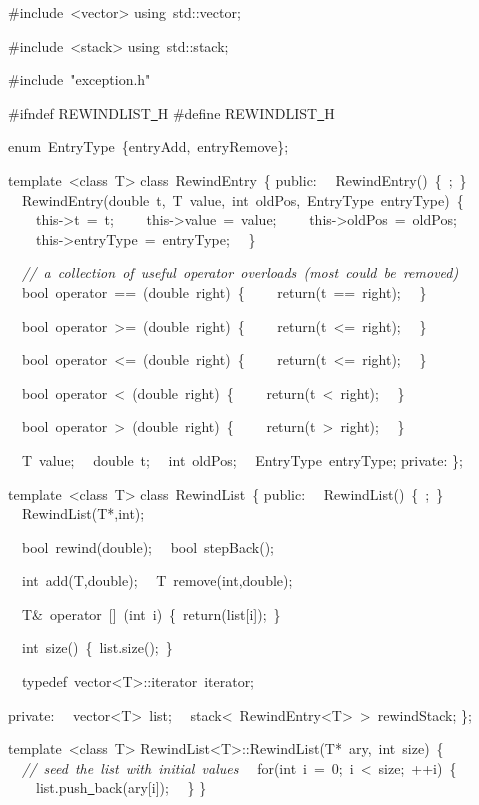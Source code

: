 {\ttfamily \raggedright \footnotesize
\#include\ <{}vector>{}
using\ std::vector;

\#include\ <{}stack>{}
using\ std::stack;

\#include\ "{}exception.h"{}

\#ifndef REWINDLIST\underline\ H
\#define REWINDLIST\underline\ H

enum\ EntryType\ \{entryAdd,\ entryRemove\};

template\ <{}class\ T>{}
class\ RewindEntry\ \{
public:
\ \ RewindEntry()\ \{\ ;\ \}
\ \ RewindEntry(double\ t,\ T\ value,\ int\ oldPos,\ EntryType\ entryType)\ \{
\ \ \ \ this-{}>{}t\ =\ t;
\ \ \ \ this-{}>{}value\ =\ value;
\ \ \ \ this-{}>{}oldPos\ =\ oldPos;
\ \ \ \ this-{}>{}entryType\ =\ entryType;
\ \ \}

\ \ \textsl{//\ a\ collection\ of\ useful\ operator\ overloads\ (most\ could\ be\ removed)}
\ \ bool\ operator\ ==\ (double\ right)\ \{
\ \ \ \ return(t\ ==\ right);
\ \ \}

\ \ bool\ operator\ >{}=\ (double\ right)\ \{
\ \ \ \ return(t\ <{}=\ right);
\ \ \}

\ \ bool\ operator\ <{}=\ (double\ right)\ \{
\ \ \ \ return(t\ <{}=\ right);
\ \ \}

\ \ bool\ operator\ <{}\ (double\ right)\ \{
\ \ \ \ return(t\ <{}\ right);
\ \ \}

\ \ bool\ operator\ >{}\ (double\ right)\ \{
\ \ \ \ return(t\ >{}\ right);
\ \ \}

\ \ T\ value;
\ \ double\ t;
\ \ int\ oldPos;
\ \ EntryType\ entryType;
private:
\};

template\ <{}class\ T>{}
class\ RewindList\ \{
public:
\ \ RewindList()\ \{\ ;\ \}
\ \ RewindList(T*,int);

\ \ bool\ rewind(double);
\ \ bool\ stepBack();

\ \ int\ add(T,double);
\ \ T\ remove(int,double);

\ \ T\&\ operator\ []\ (int\ i)\ \{\ return(list[i]);\ \}

\ \ int\ size()\ \{\ list.size();\ \}

\ \ typedef\ vector<{}T>{}::iterator\ iterator;

private:
\ \ vector<{}T>{}\ list;
\ \ stack<{}\ RewindEntry<{}T>{}\ >{}\ rewindStack;
\};

template\ <{}class\ T>{}
RewindList<{}T>{}::RewindList(T*\ ary,\ int\ size)\ \{
\ \ \textsl{//\ seed\ the\ list\ with\ initial\ values}
\ \ for(int\ i\ =\ 0;\ i\ <{}\ size;\ ++i)\ \{
\ \ \ \ list.push\underline\ back(ary[i]);
\ \ \}
\}

}
